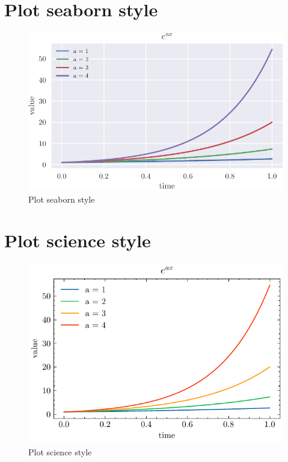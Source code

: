 \documentclass{article}
\begin{document}
\section{Plot seaborn style}
\lipsum[10]
\begin{figure}[!ht]
    \centering
    \includegraphics{images/plot9.pdf}
    \caption{Plot seaborn style}
    \label{fig:plot_9}
\end{figure}
\clearpage

\section{Plot science style}
\lipsum[11]
\begin{figure}[!ht]
    \centering
    \includegraphics{images/plot10.pdf}
    \caption{Plot science style}
    \label{fig:plot_10}
\end{figure}
\clearpage
\end{document}
